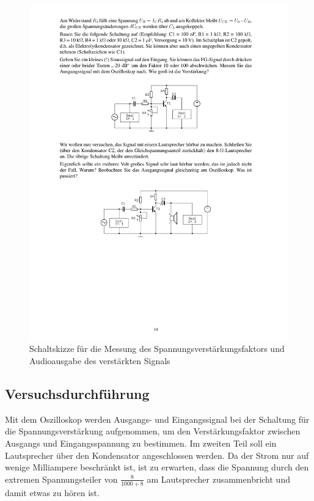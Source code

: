 \documentclass[12pt,a4paper]{article}
\begin{document}
\begin{figure}[H] 
  \centering
    \includegraphics[trim = 10mm 65mm 10mm 150mm, clip, scale = 1]{ep3_14[Page14].pdf}
  	\caption[Schaltskizze für die Messung des Spannungsverstärkungsfaktors und Audioausgabe des verstärkten Signals]{Schaltskizze für die Messung des Spannungsverstärkungsfaktors und Audioausgabe des verstärkten Signals\footnotemark}
  \label{fig:3}
\end{figure}

\subsection{Versuchsdurchführung}
Mit dem Oszilloskop werden Ausgangs- und Eingangssignal bei der Schaltung für die Spannungsverstärkung aufgenommen, um den Verstärkungsfaktor zwischen Ausgangs und Eingangsspannung zu bestimmen. Im zweiten Teil soll ein Lautsprecher über den Kondensator angeschlossen werden. Da der Strom nur auf wenige Milliampere beschränkt ist, ist zu erwarten, dass die Spannung durch den extremen Spannungsteiler von $\frac{8}{1000 + 8}$ am Lautsprecher zusammenbricht und damit etwas zu hören ist.
\end{document}

